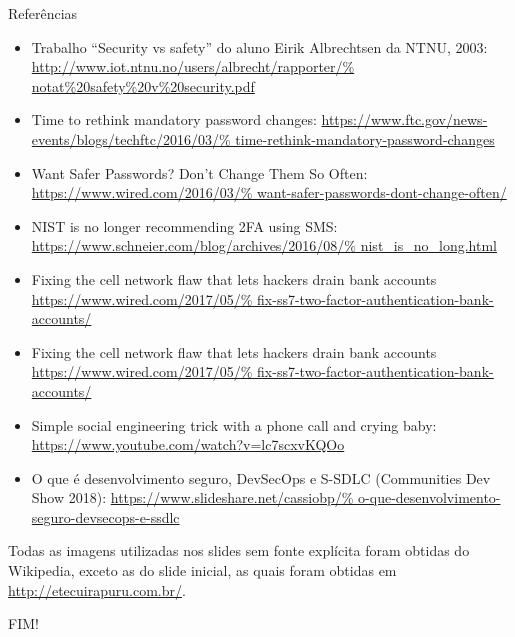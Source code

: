 \documentclass[utf8]{beamer}
\begin{document}
\begin{frame}{Referências}
  \fontsize{9pt}{9pt}\selectfont
  \begin{itemize}
    \item Trabalho ``Security vs safety'' do aluno
          Eirik Albrechtsen da NTNU, 2003:
          \url{http://www.iot.ntnu.no/users/albrecht/rapporter/%
               notat\%20safety\%20v\%20security.pdf}
    \item Time to rethink mandatory password changes:
          \url{https://www.ftc.gov/news-events/blogs/techftc/2016/03/%
               time-rethink-mandatory-password-changes}
    \item Want Safer Passwords? Don't Change Them So Often:
          \url{https://www.wired.com/2016/03/%
               want-safer-passwords-dont-change-often/}
    \item NIST is no longer recommending 2FA using SMS:
          \url{https://www.schneier.com/blog/archives/2016/08/%
               nist_is_no_long.html}
    \item Fixing the cell network flaw
          that lets hackers drain bank accounts
          \url{https://www.wired.com/2017/05/%
               fix-ss7-two-factor-authentication-bank-accounts/}
    \item Fixing the cell network flaw
          that lets hackers drain bank accounts
          \url{https://www.wired.com/2017/05/%
               fix-ss7-two-factor-authentication-bank-accounts/}
    \item Simple social engineering trick
          with a phone call and crying baby:
          \url{https://www.youtube.com/watch?v=lc7scxvKQOo}
    \item O que é desenvolvimento seguro, DevSecOps e S-SDLC
          (Communities Dev Show 2018):
          \url{https://www.slideshare.net/cassiobp/%
               o-que-desenvolvimento-seguro-devsecops-e-ssdlc}
  \end{itemize}
  Todas as imagens utilizadas nos slides sem fonte explícita
  foram obtidas do Wikipedia,
  exceto as do slide inicial,
  as quais foram obtidas em \url{http://etecuirapuru.com.br/}.
\end{frame}


\begin{frame}
  \begin{center}\fontsize{5cm}{2.5cm}\selectfont
    FIM!
  \end{center}
\end{frame}
\end{document}
